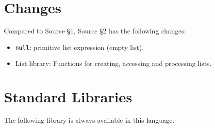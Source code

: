 





\section{Changes}

Compared to Source \S 1, Source \S 2 has the following changes:
\begin{itemize}
\item \lstinline{null}: primitive list expression (empty list).
\item List library: Functions for creating, accessing and processing lists.
\end{itemize}

\newpage





















\section{Standard Libraries}

The following library is always available in this language.







\newpage



    
